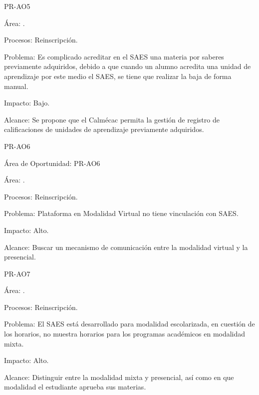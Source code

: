 
\begin{AreaOportunidad}{PR-AO5}
	\item[Área:] .
	\item[Procesos:] Reinscripción.
	\item[Problema:] Es complicado acreditar en el SAES una materia por saberes previamente adquiridos, debido a que cuando un alumno acredita una unidad de aprendizaje por este medio el SAES, se tiene que realizar la baja de forma manual.
	\item[Impacto:] Bajo.
	\item[Alcance:]Se propone que el Calmécac permita la gestión de registro de calificaciones de unidades de aprendizaje previamente adquiridos.
\end{AreaOportunidad}


\begin{AreaOportunidad}{PR-AO6}
	\item[Área de Oportunidad:] PR-AO6
	\item[Área:] .
	\item[Procesos:] Reinscripción.
	\item[Problema:] Plataforma en Modalidad Virtual no tiene vinculación con SAES.
	\item[Impacto:] Alto.
	\item[Alcance:] Buscar un mecanismo de comunicación entre la modalidad virtual y la presencial.
\end{AreaOportunidad}


\begin{AreaOportunidad}{PR-AO7}
	\item[Área:] .
	\item[Procesos:] Reinscripción.
	\item[Problema:] El SAES está desarrollado para modalidad escolarizada, en cuestión de los horarios, no muestra horarios para los programas académicos en modalidad mixta.
	\item[Impacto:] Alto.
	\item[Alcance:] Distinguir entre la modalidad mixta y presencial, así como en que modalidad el estudiante aprueba sus materias.
\end{AreaOportunidad}

